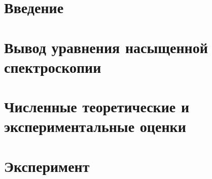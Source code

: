 


\section{Введение}



\newpage
\section{Вывод уравнения насыщенной спектроскопии}





\newpage
\section{Численные теоретические и экспериментальные оценки}



\newpage
\section{Эксперимент}



\newpage


